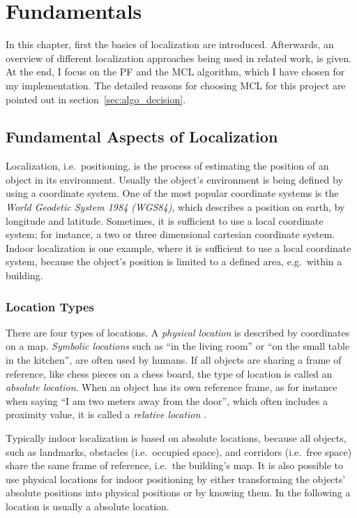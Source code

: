 \chapter{Fundamentals}\label{chap:fundamentals}

In this chapter, first the basics of localization are introduced. Afterwards, an overview of different localization approaches being used in related work, is given. At the end, I focus on the \acl{PF} and the \acl{MCL} algorithm, which I have chosen for my implementation. The detailed reasons for choosing \ac{MCL} for this project are pointed out in section~\ref{sec:algo_decision}.

\section{Fundamental Aspects of Localization}\label{sec:fund_loc}

Localization, i.e.\ positioning, is the process of estimating the position of an object in its environment. Usually the object's environment is being defined by using a coordinate system. One of the most popular coordinate systems is the \emph{World Geodetic System 1984 (WGS84)}, which describes a position on earth, by longitude and latitude. Sometimes, it is sufficient to use a local coordinate system; for instance, a two or three dimensional cartesian coordinate system. Indoor localization is one example, where it is sufficient to use a local coordinate system, because the object's position is limited to a defined area, e.g.\ within a building.

\subsection{Location Types}
There are four types of locations. A \emph{physical location} is described by coordinates on a map. \emph{Symbolic locations} such as ``in the living room'' or ``on the small table in the kitchen'', are often used by humans. If all objects are sharing a frame of reference, like chess pieces on a chess board, the type of location is called an \emph{absolute location}. When an object has its own reference frame, as for instance when saying ``I am two meters away from the door'', which often includes a proximity value, it is called a \emph{relative location} \citep{IEEE:survey_wireless_indoor_pos}.

Typically indoor localization is based on absolute locations, because all objects, such as landmarks, obstacles (i.e.\ occupied space), and corridors (i.e.\ free space) share the same frame of reference, i.e.\ the building's map. It is also possible to use physical locations for indoor positioning by either transforming the objects' absolute positions into physical positions or by knowing them. In the following a location is usually a absolute location.

